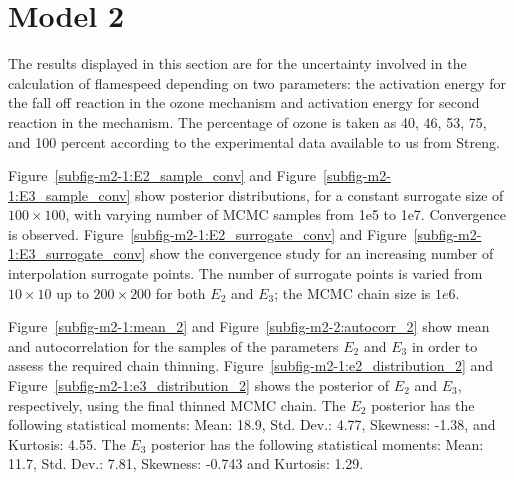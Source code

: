 \section{Model 2}

The results displayed in this section are for the uncertainty involved
in the calculation of flamespeed depending on two parameters: the
activation energy for the fall off reaction in the ozone mechanism and
activation energy for second reaction in the mechanism. The percentage
of ozone is taken as 40, 46, 53, 75, and 100 percent according to the
experimental data available to us from Streng\cite{Streng}.


Figure~\ref{subfig-m2-1:E2_sample_conv} and
Figure~\ref{subfig-m2-1:E3_sample_conv} show posterior distributions,
for a constant surrogate size of
$100\times 100$, with varying number of MCMC samples from 1e5 to 1e7. Convergence is observed.
Figure~\ref{subfig-m2-1:E2_surrogate_conv} and
Figure~\ref{subfig-m2-1:E3_surrogate_conv} show the convergence study for
an increasing number of interpolation surrogate points. The number of
surrogate points is varied from $10\times 10$ up to $200\times 200$
for both $E_2$ and $E_3$; the MCMC chain size is
$1e6$.

Figure~\ref{subfig-m2-1:mean_2} and
Figure~\ref{subfig-m2-2:autocorr_2} show mean and autocorrelation
for the samples of the parameters $E_2$ and $E_3$ in order to assess
the required chain thinning.
Figure~\ref{subfig-m2-1:e2_distribution_2} and
Figure~\ref{subfig-m2-1:e3_distribution_2} shows the posterior of
$E_2$ and $E_3$, respectively, using the final thinned MCMC chain.
The $E_2$ posterior has the following statistical moments:
Mean: 18.9, Std. Dev.: 4.77, Skewness: -1.38, and Kurtosis: 4.55.
The $E_3$ posterior has the following statistical moments:
Mean: 11.7, Std. Dev.: 7.81, Skewness: -0.743 and Kurtosis: 1.29.


